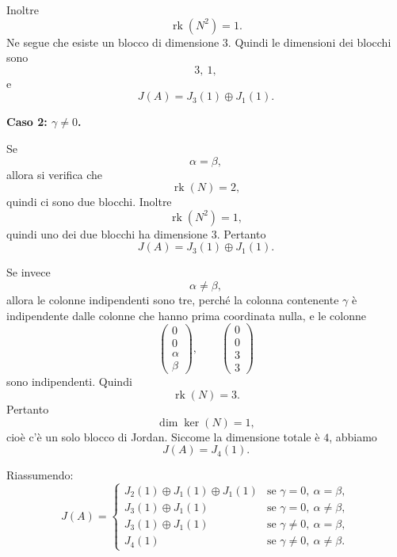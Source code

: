 \documentclass[a4paper]{article}
\begin{document}
\begin{radioactive}
\begin{snippetsolution}{}
    Inoltre
    \[
        \operatorname{rk}(N^2)=1.
    \]
    Ne segue che esiste un blocco di dimensione \(3\). Quindi le dimensioni dei blocchi sono
    \[
        3,\ 1,
    \]
    e
    \[
        J(A)=J_3(1)\oplus J_1(1).
    \]

    \textbf{Caso 2: \(\gamma\neq 0\).}

    Se
    \[
        \alpha=\beta,
    \]
    allora si verifica che
    \[
        \operatorname{rk}(N)=2,
    \]
    quindi ci sono due blocchi. Inoltre
    \[
        \operatorname{rk}(N^2)=1,
    \]
    quindi uno dei due blocchi ha dimensione \(3\). Pertanto
    \[
        J(A)=J_3(1)\oplus J_1(1).
    \]

    Se invece
    \[
        \alpha\neq \beta,
    \]
    allora le colonne indipendenti sono tre, perché la colonna contenente \(\gamma\) è indipendente dalle colonne che hanno prima coordinata nulla, e le colonne
    \[
        \begin{pmatrix}
            0\\
            0\\
            \alpha\\
            \beta
        \end{pmatrix},
        \qquad
        \begin{pmatrix}
            0\\
            0\\
            3\\
            3
        \end{pmatrix}
    \]
    sono indipendenti.
    Quindi
    \[
        \operatorname{rk}(N)=3.
    \]
    Pertanto
    \[
        \dim\ker(N)=1,
    \]
    cioè c'è un solo blocco di Jordan. Siccome la dimensione totale è \(4\), abbiamo
    \[
        J(A)=J_4(1).
    \]

    Riassumendo:
    \[
        J(A)=
        \begin{cases}
            J_2(1)\oplus J_1(1)\oplus J_1(1)
            & \text{se } \gamma=0,\ \alpha=\beta,\\[4pt]
            J_3(1)\oplus J_1(1)
            & \text{se } \gamma=0,\ \alpha\neq \beta,\\[4pt]
            J_3(1)\oplus J_1(1)
            & \text{se } \gamma\neq 0,\ \alpha=\beta,\\[4pt]
            J_4(1)
            & \text{se } \gamma\neq 0,\ \alpha\neq \beta.
        \end{cases}
    \]
\end{snippetsolution}
\end{radioactive}
\end{document}
